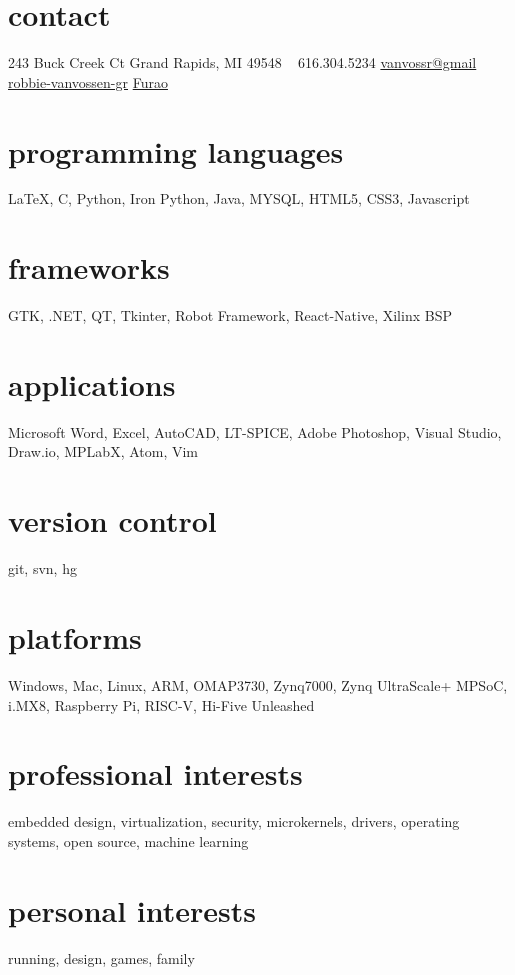 \documentclass[a4paper]{cv-friggeri-x}
\begin{document}


\begin{aside} %
\section{contact}
\pin \hfill 243 Buck Creek Ct
Grand Rapids, MI 49548
~
{\Large\textcolor{gray}{\Mobilefone}} \hfill 616.304.5234
{\Large\textcolor{gray}{\Letter}} \hfill \href{mailto:vanvossr@gmail.com}{vanvossr@gmail}
~
\llogo \hfill \href{https://www.linkedin.com/in/robbie-vanvossen-gr/}{robbie-vanvossen-gr}
\ghlogo \hfill \href{http://github.com/Furao}{Furao}
~
\section{programming languages}
{\Large\textcolor{gray}{\Keyboard}} \LaTeX, C, Python, Iron Python, Java, MYSQL, HTML5, CSS3, Javascript
\section{frameworks}
GTK, .NET, QT, Tkinter, Robot Framework, React-Native, Xilinx BSP
\section{applications}
Microsoft Word, Excel, AutoCAD, LT-SPICE, Adobe Photoshop, Visual Studio, Draw.io, MPLabX, Atom, Vim
\section{version control}
git, svn, hg
\section{platforms}
Windows, Mac, Linux, ARM, OMAP3730, Zynq7000, Zynq UltraScale+ MPSoC, i.MX8, Raspberry Pi, RISC-V, Hi-Five Unleashed
\section{professional interests}
embedded design, virtualization, security, microkernels, drivers, operating systems, open source, machine learning
\section{personal interests}
running, design, games, family
\end{aside}
\end{document}
